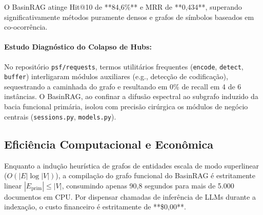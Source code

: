 \documentclass[10pt,twocolumn]{article}
\theoremstyle{definition}
\begin{document}
\begin{table}[t]
\centering
\caption{Localização de defeitos no Princeton SWE-bench Lite.}
\label{tab:swebench_pt}
\end{table}

O BasinRAG atinge Hit@10 de **84,6\%** e MRR de **0,434**, superando significativamente métodos puramente densos e grafos de símbolos baseados em co-ocorrência.

\paragraph{Estudo Diagnóstico do Colapso de Hubs:} No repositório \texttt{psf/requests}, termos utilitários frequentes (\texttt{encode}, \texttt{detect}, \texttt{buffer}) interligaram módulos auxiliares (e.g., detecção de codificação), sequestrando a caminhada do grafo e resultando em 0\% de recall em 4 de 6 instâncias. O BasinRAG, ao confinar a difusão espectral ao subgrafo induzido da bacia funcional primária, isolou com precisão cirúrgica os módulos de negócio centrais (\texttt{sessions.py}, \texttt{models.py}).

\subsection{Eficiência Computacional e Econômica}

Enquanto a indução heurística de grafos de entidades escala de modo superlinear ($O(|E| \log |V|)$), a compilação do grafo funcional do BasinRAG é estritamente linear $|E_{\text{prim}}| \le |V|$, consumindo apenas 90,8 segundos para mais de 5.000 documentos em CPU. Por dispensar chamadas de inferência de LLMs durante a indexação, o custo financeiro é estritamente de **\$0,00**.
\end{document}
